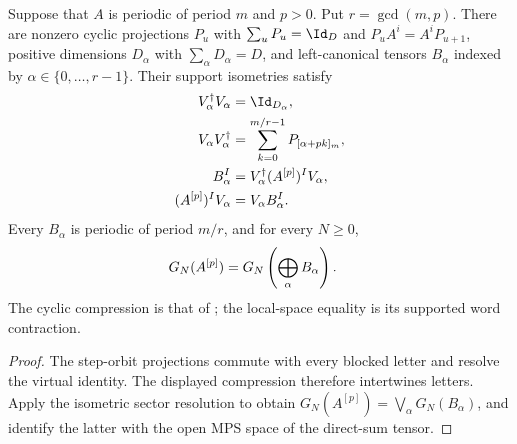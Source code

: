 \begin{lemma}
    \label{thm:periodic_blocked_ground_space}
    \leanok
    Suppose that $A$ is periodic of period $m$ and $p>0$.
    Put $r=\gcd(m,p)$. There are nonzero cyclic projections $P_u$ with
    $\sum_uP_u=\Id_D$ and $P_uA^i=A^iP_{u+1}$, positive dimensions
    $D_\alpha$ with $\sum_\alpha D_\alpha=D$, and left-canonical tensors
    $B_\alpha$ indexed by $\alpha\in\{0,\ldots,r-1\}$.
    Their support isometries satisfy
    \begin{align}
        V_\alpha^\dagger V_\alpha & =\Id_{D_\alpha},\notag                      \\
        V_\alpha V_\alpha^\dagger & =
        \sum_{k=0}^{m/r-1}P_{[\alpha+pk]_m},\notag                              \\
        B_\alpha^I                & =V_\alpha^\dagger(A^{[p]})^IV_\alpha,\notag \\
        (A^{[p]})^IV_\alpha       & =V_\alpha B_\alpha^I.\notag
    \end{align}
    Every $B_\alpha$ is periodic of period $m/r$, and for every $N\ge0$,
    \begin{align}
        G_N(A^{[p]}) & =G_N\left(\bigoplus_\alpha B_\alpha\right).\notag
    \end{align}
    The cyclic compression is that of
    \cite[Lemma~6]{DeLasCuevas2017Irreducible}; the local-space equality
    is its supported word contraction.
\end{lemma}
\begin{proof}\leanok
    The step-orbit projections commute with every blocked letter and resolve
    the virtual identity. The displayed compression therefore intertwines
    letters. Apply the isometric sector resolution to obtain
    $G_N(A^{[p]})=\bigvee_\alpha G_N(B_\alpha)$, and identify the latter
    with the open MPS space of the direct-sum tensor.
\end{proof}

